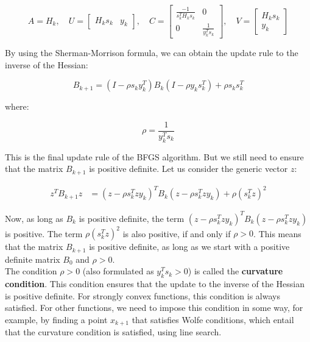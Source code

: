\begin{equation*}
    A = H_k, \quad U = \begin{bmatrix}
        H_k s_k & y_k
    \end{bmatrix}, \quad C =\begin{bmatrix}
        \frac{-1}{s_k^T H_k s_k} & 0\\
        0 & \frac{1}{y_k^T s_k}
    \end{bmatrix}, \quad V = \begin{bmatrix}
        H_k s_k\\
        y_k
    \end{bmatrix}
\end{equation*}
        
By using the Sherman-Morrison formula, we can obtain the update rule to the inverse of the Hessian:

\begin{equation}
    B_{k+1} = (I - \rho s_k y_k^T) B_k (I - \rho y_k s_k^T) + \rho s_k s_k^T
\end{equation}

where:

$$\rho = \frac{1}{y_k^T s_k}$$

This is the final update rule of the BFGS algorithm. But we still need to ensure that the matrix
$B_{k+1}$ is positive definite. Let us consider the generic vector $z$:

\begin{align*}
    z^T B_{k+1} z &= (z - \rho s_k^T z y_k)^T B_k (z - \rho s_k^T z y_k) + \rho (s_k^T z)^2
\end{align*}

Now, as long as $B_k$ is positive definite, the term $(z - \rho s_k^T z y_k)^T B_k (z - \rho s_k^T z y_k)$
is positive. The term $\rho (s_k^T z)^2$ is also positive, if and only if $\rho > 0$. This means
that the matrix $B_{k+1}$ is positive definite, as long as we start with a positive definite matrix
$B_0$ and $\rho > 0$.\\

The condition $\rho > 0$ (also formulated as $y_k^T s_k > 0$) is called the \textbf{curvature condition}.
This condition ensures that the update to the inverse of the Hessian is positive definite. For strongly
convex functions, this condition is always satisfied. For other functions, we need to impose this
condition in some way, for example, by finding a point $x_{k+1}$ that satisfies Wolfe conditions, which
entail that the curvature condition is satisfied, using line search.\\

